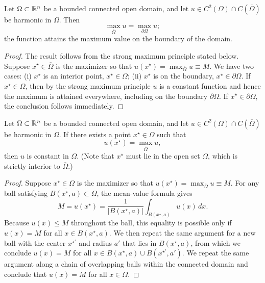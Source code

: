 \begin{theorem}
    Let $\Omega \subset \mathbb{R}^n$ be a bounded connected open domain, and let $u \in C^2(\Omega) \cap C(\overline{\Omega})$ be harmonic in $\Omega$. Then
    \[\max_{\overline{\Omega}} u = \max_{\partial\Omega} u;\]
    the function attains the maximum value on the boundary of the domain.
\end{theorem}
\begin{proof}
    The result follows from the strong maximum principle stated below. Suppose $x^\star \in \overline{\Omega}$ is the maximizer so that $u(x^\star) = \max_{\overline{\Omega}} u \equiv M$. We have two cases: (i) $x^\star$ is an interior point, $x^\star \in \Omega$; (ii) $x^\star$ is on the boundary, $x^\star \in \partial\Omega$. If $x^\star \in \Omega$, then by the strong maximum principle $u$ is a constant function and hence the maximum is attained everywhere, including on the boundary $\partial\Omega$. If $x^\star \in \partial\Omega$, the conclusion follows immediately.
\end{proof}

\begin{theorem}
    Let $\Omega \subset \mathbb{R}^n$ be a bounded connected open domain, and let $u \in C^2(\Omega) \cap C(\overline{\Omega})$ be harmonic in $\Omega$. If there exists a point $x^\star \in \Omega$ such that
    \[u(x^\star) = \max_{\overline{\Omega}} u,\]
    then $u$ is constant in $\Omega$. (Note that $x^\star$ must lie in the open set $\Omega$, which is strictly interior to $\overline{\Omega}$.)
\end{theorem}
\begin{proof}
    Suppose $x^\star \in \Omega$ is the maximizer so that $u(x^\star) = \max_{\overline{\Omega}} u \equiv M$. For any ball satisfying $\overline{B(x^\star, a)} \subset \Omega$, the mean-value formula gives
    \[M = u(x^\star) = \frac{1}{|B(x^\star, a)|} \int_{B(x^\star, a)} u(x)\,dx.\]
    Because $u(x) \leq M$ throughout the ball, this equality is possible only if $u(x) = M$ for all $x \in B(x^\star, a)$. We then repeat the same argument for a new ball with the center $x^{\star\prime}$ and radius $a'$ that lies in $B(x^\star, a)$, from which we conclude $u(x) = M$ for all $x \in B(x^\star, a) \cup B(x^{\star\prime}, a')$. We repeat the same argument along a chain of overlapping balls within the connected domain and conclude that $u(x) = M$ for all $x \in \Omega$.
\end{proof}

